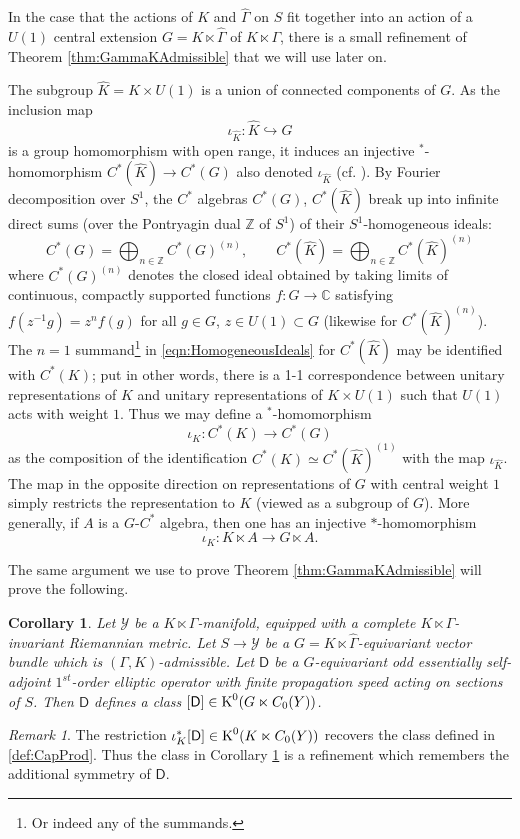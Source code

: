 \documentclass[11pt,reqno]{amsart}
\newtheorem{corollary}[theorem]{Corollary}
\theoremstyle{definition}
\theoremstyle{remark}
\newtheorem{remark}[theorem]{Remark}
\newcommand{\wh}[1]{\widehat{#1}}
\newcommand{\st}[1]{\mathsf{#1}}
\def\Y{\ensuremath{\mathcal{Y}}}
\def\K{\ensuremath{\mathcal{K}}}
\def\bC{\ensuremath{\mathbb{C}}}
\def\bZ{\ensuremath{\mathbb{Z}}}
\def\K{\ensuremath{\textnormal{K}}}
\begin{document}
In the case that the actions of $K$ and $\wh{\Gamma}$ on $S$ fit together into an action of a $U(1)$ central extension $G=K\ltimes \wh{\Gamma}$ of $K\ltimes \Gamma$, there is a small refinement of Theorem \ref{thm:GammaKAdmissible} that we will use later on.  

The subgroup $\wh{K}=K\times U(1)$ is a union of connected components of $G$.  As the inclusion map 
\[ \iota_{\wh{K}} \colon \wh{K} \hookrightarrow G \] 
is a group homomorphism with open range, it induces an injective $^\ast$-homomorphism $C^\ast(\wh{K}) \rightarrow C^\ast(G)$ also denoted $\iota_{\wh{K}}$ (cf. \cite[Section 7]{ChrisPhillipsLecNotes}).  By Fourier decomposition over $S^1$, the $C^\ast$ algebras $C^\ast(G)$, $C^\ast(\wh{K})$ break up into infinite direct sums (over the Pontryagin dual $\bZ$ of $S^1$) of their $S^1$-homogeneous ideals:
\begin{equation} 
\label{eqn:HomogeneousIdeals}
C^\ast(G) = \bigoplus_{n \in \bZ} C^\ast(G)^{(n)}, \qquad C^\ast(\wh{K})=\bigoplus_{n \in \bZ} C^\ast(\wh{K})^{(n)}
\end{equation}
where $C^\ast(G)^{(n)}$ denotes the closed ideal obtained by taking limits of continuous, compactly supported functions $f \colon G \rightarrow \bC$ satisfying $f(z^{-1}g)=z^nf(g)$ for all $g \in G$, $z \in U(1) \subset G$ (likewise for $C^\ast(\wh{K})^{(n)}$).  The $n=1$ summand\footnote{Or indeed any of the summands.} in \eqref{eqn:HomogeneousIdeals} for $C^\ast(\wh{K})$ may be identified with $C^\ast(K)$; put in other words, there is a 1-1 correspondence between unitary representations of $K$ and unitary representations of $K \times U(1)$ such that $U(1)$ acts with weight $1$.  Thus we may define a $^\ast$-homomorphism
\[ \iota_K \colon C^\ast(K) \rightarrow C^\ast(G) \]
as the composition of the identification $C^\ast(K)\simeq C^\ast(\wh{K})^{(1)}$ with the map $\iota_{\wh{K}}$.  The map in the opposite direction on representations of $G$ with central weight $1$ simply restricts the representation to $K$ (viewed as a subgroup of $G$). More generally, if $A$ is a $G$-$C^\ast$ algebra, then one has an injective $\ast$-homomorphism
\[ \iota_K \colon K \ltimes A \rightarrow G \ltimes A.\]

The same argument we use to prove Theorem \ref{thm:GammaKAdmissible} will prove the following.
\begin{corollary}
\label{cor:Refine}
Let $\Y$ be a $K\ltimes \Gamma$-manifold, equipped with a complete $K\ltimes \Gamma$-invariant Riemannian metric.  Let $S \rightarrow \Y$ be a $G=K\ltimes \wh{\Gamma}$-equivariant vector bundle which is $(\Gamma,K)$-admissible.  Let $\st{D}$ be a $G$-equivariant odd essentially self-adjoint $1^{st}$-order elliptic operator with finite propagation speed acting on sections of $S$.  Then $\st{D}$ defines a class $[\st{D}] \in \K^0(G \ltimes C_0(Y))$.
\end{corollary}
\begin{remark}
\label{rem:Refine}
The restriction $\iota_K^\ast[\st{D}] \in \K^0(K\ltimes C_0(Y))$ recovers the class defined in \ref{def:CapProd}.  Thus the class in Corollary \ref{cor:Refine} is a refinement which remembers the additional symmetry of $\st{D}$.
\end{remark}
\end{document}
